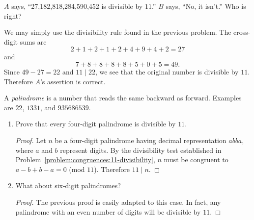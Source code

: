 $A$ says, ``27,182,818,284,590,452 is divisible by
$11$.'' $B$ says, ``No, it isn't.'' Who is right?
\begin{solution}
  We may simply use the divisibility rule found in the previous
  problem. The cross-digit sums are
  \begin{equation*}
    2 + 1 + 2 + 1 + 2 + 4 + 9 + 4 + 2 = 27
  \end{equation*}
  and
  \begin{equation*}
    7 + 8 + 8 + 8 + 8 + 5 + 0 + 5 = 49.
  \end{equation*}
  Since $49 - 27 = 22$ and $11\mid22$, we see that the original number
  is divisible by $11$. Therefore $A$'s assertion is correct.
\end{solution}

 A {\em palindrome} is a number that reads the same
backward as forward. Examples are $22$, $1331$, and $935686539$.
\begin{enumerate}
\item Prove that every four-digit palindrome is divisible by $11$.
  \begin{proof}
    Let $n$ be a four-digit palindrome having decimal representation
    $abba$, where $a$ and $b$ represent digits. By the divisibility
    test established in
    Problem~\ref{problem:congruences:11-divisibility}, $n$ must be
    congruent to $a - b + b - a = 0$ (mod $11$). Therefore $11\mid n$.
  \end{proof}
\item What about six-digit palindromes?
  \begin{proof}
    The previous proof is easily adapted to this case. In fact, any
    palindrome with an even number of digits will be divisible by
    $11$.
  \end{proof}
\end{enumerate}
